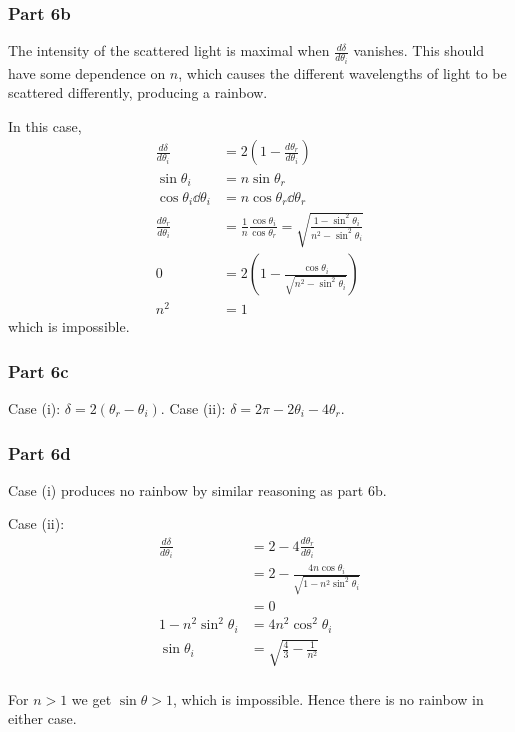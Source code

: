 \documentclass{article}
\begin{document}
\subsubsection{Part 6b}
The intensity of the scattered light is maximal when $\frac{d\delta}{d\theta_i}$ vanishes. This should have some dependence on $n$, which causes the different wavelengths of light to be scattered differently, producing a rainbow. 

In this case, 
\begin{align}
    \frac{d\delta}{d\theta_i} &= 2\left(1-\frac{d\theta_r}{d\theta_i}\right) \\
    \sin\theta_i &= n\sin\theta_r \\
    \cos\theta_i \dd{\theta_i} &= n\cos\theta_r \dd{\theta_r} \\
    \frac{d\theta_r}{d\theta_i} &= \frac{1}{n} \frac{\cos\theta_i}{\cos\theta_r} = \sqrt{\frac{1-\sin^2\theta_i}{n^2-\sin^2\theta_i}} \\
    0 &= 2\left(1-\frac{\cos\theta_i}{\sqrt {n^2-\sin^2\theta_i}} \right) \\
    n^2 &= 1
\end{align}
which is impossible.

\subsubsection{Part 6c}
Case (i): $\delta = 2(\theta_r - \theta_i)$. Case (ii): $\delta = 2\pi - 2\theta_i - 4\theta_r$.

\subsubsection{Part 6d}
Case (i) produces no rainbow by similar reasoning as part 6b. 

Case (ii):
\begin{align}
    \frac{d\delta}{d\theta_i} &= 2-4\frac{d\theta_r}{d\theta_i} \\
    &= 2-\frac{4n\cos\theta_i}{\sqrt{1-n^2\sin^2\theta_i}} \\
    &= 0 \\
    1-n^2\sin^2\theta_i &= 4n^2\cos^2\theta_i \\
    \sin\theta_i& = \sqrt{\frac{4}{3} - \frac{1}{n^2}} \\
\end{align}

For $n>1$ we get $\sin\theta>1$, which is impossible. Hence there is no rainbow in either case.
\end{document}
